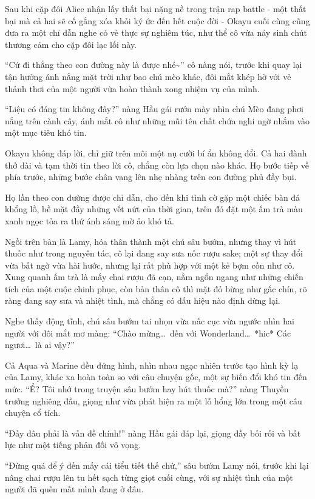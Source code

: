 \documentclass[../main.tex]{subfiles}
\begin{document}
\ct

Sau khi cặp đôi Alice nhận lấy thất bại nặng nề trong trận rap battle - một thất bại mà cả hai sẽ cố gắng xóa khỏi ký ức đến hết cuộc đời - Okayu cuối cùng cũng đưa ra một chỉ dẫn nghe có vẻ thực sự nghiêm túc, như thể cô vừa nảy sinh chút thương cảm cho cặp đôi lạc lối này.

``Cứ đi thẳng theo con đường này là được nhé\~{}'' cô nàng nói, trước khi quay lại tận hưởng ánh nắng mặt trời như bao chú mèo khác, đôi mắt khép hờ với vẻ thảnh thơi của một người vừa hoàn thành xong nhiệm vụ của mình.

``Liệu có đáng tin không đây?'' nàng Hầu gái rướn mày nhìn chú Mèo đang phơi nắng trên cành cây, ánh mắt cô như những mũi tên chất chứa nghi ngờ nhắm vào một mục tiêu khó tin.

Okayu không đáp lời, chỉ giữ trên môi một nụ cười bí ẩn không đổi. Cả hai đành thở dài và tạm thời tin theo lời cô, chẳng còn lựa chọn nào khác. Họ bước tiếp về phía trước, những bước chân vang lên nhẹ nhàng trên con đường phủ đầy bụi.

Họ lần theo con đường được chỉ dẫn, cho đến khi tình cờ gặp một chiếc bàn đá khổng lồ, bề mặt đầy những vết nứt của thời gian, trên đó đặt một ấm trà màu xanh ngọc tỏa ra thứ ánh sáng mờ ảo khó tả.

Ngồi trên bàn là Lamy, hóa thân thành một chú sâu bướm, nhưng thay vì hút thuốc như trong nguyên tác, cô lại đang say sưa nốc rượu sake; một sự thay đổi vừa bất ngờ vừa hài hước, nhưng lại rất phù hợp với một kẻ bợm cồn như cô. Xung quanh ấm trà là mấy chai rượu đã cạn, nằm ngổn ngang như những chiến tích của một cuộc chinh phục, còn bản thân cô thì mặt đỏ bừng như gấc chín, rõ ràng đang say sưa và nhiệt tình, mà chẳng có dấu hiệu nào định dừng lại.

Nghe thấy động tĩnh, chú sâu bướm tai nhọn vừa nấc cục vừa ngước nhìn hai người với đôi mắt mơ màng: ``Chào mừng\dots\ đến với Wonderland\dots\ *hic* Các ngươi\dots\ là ai vậy?''

Cả Aqua và Marine đều đứng hình, nhìn nhau ngạc nhiên trước tạo hình kỳ lạ của Lamy, khác xa hoàn toàn so với câu chuyện gốc, một sự biến đổi khó tin đến mức. ``Ể? Tôi nhớ trong truyện sâu bướm hay hút thuốc mà?'' nàng Thuyền trưởng nghiêng đầu, giọng như vừa phát hiện ra một lỗ hổng lớn trong một câu chuyện cổ tích.

``Đấy đâu phải là vấn đề chính!'' nàng Hầu gái đáp lại, giọng đầy bối rối và bất lực như một tiếng phản đối vô vọng.

``Đừng quá để ý đến mấy cái tiểu tiết thế chứ,'' sâu bướm Lamy nói, trước khi lại nâng chai rượu lên tu hết sạch từng giọt cuối cùng, với sự nhiệt tình của một người đã quên mất mình đang ở đâu.
\end{document}
